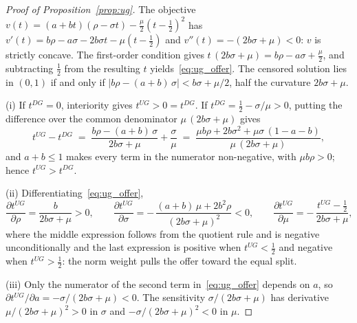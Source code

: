 \documentclass[11pt]{article}
\theoremstyle{plain}
\theoremstyle{remark}
\begin{document}
\begin{proof}[Proof of Proposition~\ref{prop:ug}]
The objective $v(t)=(a+bt)(\rho-\sigma t)-\frac{\mu}{2}\left(t-\frac12\right)^{2}$ has $v'(t)=b\rho-a\sigma-2b\sigma t-\mu\left(t-\frac12\right)$ and $v''(t)=-(2b\sigma+\mu)<0$: $v$ is strictly concave. The first-order condition gives $t\,(2b\sigma+\mu)=b\rho-a\sigma+\frac{\mu}{2}$, and subtracting $\frac12$ from the resulting $t$ yields~\eqref{eq:ug_offer}. The censored solution lies in $(0,1)$ if and only if $\bigl|b\rho-(a+b)\,\sigma\bigr|<b\sigma+\mu/2$, half the curvature $2b\sigma+\mu$.

(i) If $t^{DG}=0$, interiority gives $t^{UG}>0=t^{DG}$. If $t^{DG}=\frac12-\sigma/\mu>0$, putting the difference over the common denominator $\mu\,(2b\sigma+\mu)$ gives
\begin{equation*}
t^{UG}-t^{DG}\;=\;\frac{b\rho-(a+b)\,\sigma}{2b\sigma+\mu}+\frac{\sigma}{\mu}\;=\;\frac{\mu b\rho+2b\sigma^{2}+\mu\sigma\,(1-a-b)}{\mu\,(2b\sigma+\mu)},
\end{equation*}
and $a+b\le 1$ makes every term in the numerator non-negative, with $\mu b\rho>0$; hence $t^{UG}>t^{DG}$.

(ii) Differentiating~\eqref{eq:ug_offer},
\begin{equation*}
\frac{\partial t^{UG}}{\partial \rho}=\frac{b}{2b\sigma+\mu}>0,\qquad
\frac{\partial t^{UG}}{\partial \sigma}=-\,\frac{(a+b)\,\mu+2b^{2}\rho}{(2b\sigma+\mu)^{2}}<0,\qquad
\frac{\partial t^{UG}}{\partial \mu}=-\,\frac{t^{UG}-\tfrac12}{2b\sigma+\mu},
\end{equation*}
where the middle expression follows from the quotient rule and is negative unconditionally and the last expression is positive when $t^{UG}<\frac12$ and negative when $t^{UG}>\frac12$: the norm weight pulls the offer toward the equal split.

(iii) Only the numerator of the second term in~\eqref{eq:ug_offer} depends on $a$, so $\partial t^{UG}/\partial a=-\sigma/(2b\sigma+\mu)<0$. The sensitivity $\sigma/(2b\sigma+\mu)$ has derivative $\mu/(2b\sigma+\mu)^{2}>0$ in $\sigma$ and $-\sigma/(2b\sigma+\mu)^{2}<0$ in $\mu$.
\end{proof}
\end{document}
